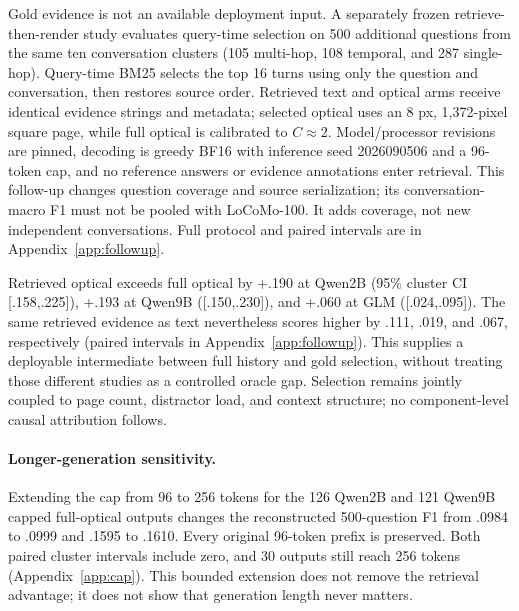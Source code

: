 \documentclass{article}
\begin{document}
Gold evidence is not an available deployment input. A separately frozen retrieve-then-render study evaluates query-time selection on 500 additional questions from the same ten conversation clusters (105 multi-hop, 108 temporal, and 287 single-hop). Query-time BM25 selects the top 16 turns using only the question and conversation, then restores source order. Retrieved text and optical arms receive identical evidence strings and metadata; selected optical uses an 8 px, 1,372-pixel square page, while full optical is calibrated to $C\approx2$. Model/processor revisions are pinned, decoding is greedy BF16 with inference seed 2026090506 and a 96-token cap, and no reference answers or evidence annotations enter retrieval. This follow-up changes question coverage and source serialization; its conversation-macro F1 must not be pooled with LoCoMo-100. It adds coverage, not new independent conversations. Full protocol and paired intervals are in Appendix~\ref{app:followup}.

\begin{table}[H]
  \centering\small
  \caption{Separate 500-question follow-up, conversation-macro F1 over ten clusters. The two BM25-selected arms share evidence; the two budget-matched text arms may select different evidence.}
  \label{tab:followup}
  
\end{table}

Retrieved optical exceeds full optical by +.190 at Qwen2B (95\% cluster CI [.158,.225]), +.193 at Qwen9B ([.150,.230]), and +.060 at GLM ([.024,.095]). The same retrieved evidence as text nevertheless scores higher by .111, .019, and .067, respectively (paired intervals in Appendix~\ref{app:followup}). This supplies a deployable intermediate between full history and gold selection, without treating those different studies as a controlled oracle gap. Selection remains jointly coupled to page count, distractor load, and context structure; no component-level causal attribution follows.

\paragraph{Longer-generation sensitivity.}
Extending the cap from 96 to 256 tokens for the 126 Qwen2B and 121 Qwen9B capped full-optical outputs changes the reconstructed 500-question F1 from .0984 to .0999 and .1595 to .1610. Every original 96-token prefix is preserved. Both paired cluster intervals include zero, and 30 outputs still reach 256 tokens (Appendix~\ref{app:cap}). This bounded extension does not remove the retrieval advantage; it does not show that generation length never matters.
\end{document}

